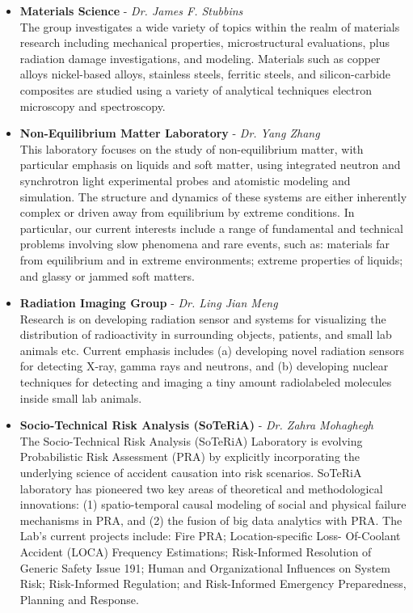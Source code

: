 \begin{itemize}
  \item \textbf{Materials Science} - \textit{Dr. James F. Stubbins}\\
  The group investigates a wide variety of topics within the realm of materials research including mechanical properties, microstructural evaluations, plus radiation damage investigations, and modeling. Materials such as copper alloys nickel-based alloys, stainless steels, ferritic steels, and silicon-carbide composites are studied using a variety of analytical techniques electron microscopy and spectroscopy.


  \item \textbf{Non-Equilibrium Matter Laboratory} - \textit{Dr. Yang Zhang}\\
  This laboratory focuses on the study of non-equilibrium matter, with particular emphasis on liquids and soft matter, using integrated neutron and synchrotron light experimental probes and atomistic modeling and simulation. The structure and dynamics of these systems are either inherently complex or driven away from equilibrium by extreme conditions. In particular, our current interests include a range of fundamental and technical problems involving slow phenomena and rare events, such as: materials far from equilibrium and in extreme environments; extreme properties of liquids; and glassy or jammed soft matters.

  \item \textbf{Radiation Imaging Group} - \textit{Dr. Ling Jian Meng}\\
  Research is on developing radiation sensor and systems for visualizing the distribution of radioactivity in surrounding objects, patients, and small lab animals etc. Current emphasis includes (a) developing novel radiation sensors for detecting X-ray, gamma rays and neutrons, and (b) developing nuclear techniques for detecting and imaging a tiny amount radiolabeled molecules inside small lab animals.

  \item \textbf{Socio-Technical Risk Analysis (SoTeRiA)} - \textit{Dr. Zahra Mohaghegh}\\
  The Socio-Technical Risk Analysis (SoTeRiA) Laboratory is evolving Probabilistic Risk Assessment (PRA) by explicitly incorporating the underlying science of accident causation into risk scenarios. SoTeRiA laboratory has pioneered two key areas of theoretical and methodological innovations: (1) spatio-temporal causal modeling of social and physical failure mechanisms in PRA, and (2) the fusion of big data analytics with PRA. The Lab’s current projects include: Fire PRA; Location-specific Loss- Of-Coolant Accident (LOCA) Frequency Estimations; Risk-Informed Resolution of Generic Safety Issue 191; Human and Organizational Influences on System Risk; Risk-Informed Regulation; and Risk-Informed Emergency Preparedness, Planning and Response.


\end{itemize}
